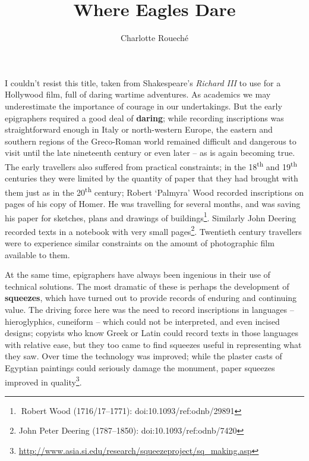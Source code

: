 \documentclass[amsthm,ebook]{saparticle}
\title{Where Eagles Dare}
\author[kcl]{Charlotte Roueché\corref{first}}
\begin{document}
\maketitle

I couldn't resist this title, taken from Shakespeare's \textit{Richard III} to 
use for a Hollywood film, full of daring wartime adventures. As academics we may 
underestimate the importance of courage in our undertakings. But the early epigraphers 
required a good deal of \textbf{daring}; while recording inscriptions was straightforward 
enough in Italy or north-western Europe, the eastern and southern regions of the 
Greco-Roman world remained difficult and dangerous to visit until the late nineteenth 
century or even later – as is again becoming true. The early travellers also 
suffered from practical constraints; in the 18\textsuperscript{th} and 19\textsuperscript{th} centuries 
they were limited by the quantity of paper that they had brought with them just 
as in the 20\textsuperscript{th} century; Robert `Palmyra' Wood recorded inscriptions 
on pages of his copy of Homer. He was travelling for several months, and was saving 
his paper for sketches, plans and drawings of buildings\footnote{Robert Wood (1716/17–1771): doi:10.1093/ref:odnb/29891}. Similarly John Deering 
recorded texts in a notebook with very small pages\footnote{John Peter Deering (1787–1850): doi:10.1093/ref:odnb/7420}. Twentieth century travellers 
were to experience similar constraints on the amount of photographic film available 
to them.

At the same time, epigraphers have always been ingenious in their use of technical 
solutions. The most dramatic of these is perhaps the development of \textbf{squeezes}, 
which have turned out to provide records of enduring and continuing value. The 
driving force here was the need to record inscriptions in languages – hieroglyphics, 
cuneiform – which could not be interpreted, and even incised designs; copyists 
who know Greek or Latin could record texts in those languages with relative ease, 
but they too came to find squeezes useful in representing what they saw. Over time 
the technology was improved; while the plaster casts of Egyptian paintings could 
seriously damage the monument, paper squeezes improved in quality\footnote{\url{http://www.asia.si.edu/research/squeezeproject/sq_making.asp}}. 
\end{document}
